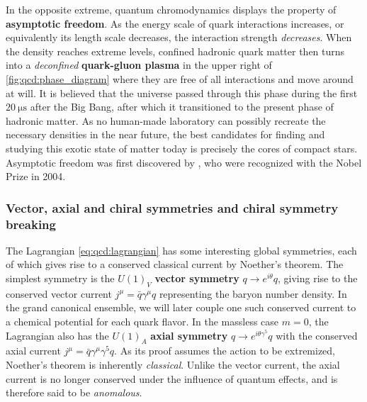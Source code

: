 In the opposite extreme, quantum chromodynamics displays the property of \textbf{asymptotic freedom}.
As the energy scale of quark interactions increases, or equivalently its length scale decreases, the interaction strength \emph{decreases}.
When the density reaches extreme levels, confined hadronic quark matter then turns into a \emph{deconfined} \textbf{quark-gluon plasma} in the upper right of \cref{fig:qcd:phase_diagram} where they are free of all interactions and move around at will.
It is believed that the universe passed through this phase during the first $\SI{20}{\micro\second}$ after the Big Bang, after which it transitioned to the present phase of hadronic matter.
As no human-made laboratory can possibly recreate the necessary densities in the near future, the best candidates for finding and studying this exotic state of matter today is precisely the cores of compact stars.
Asymptotic freedom was first discovered by \cite{ref:asymptotic_freedom_gross_wilczek,ref:asymptotic_freedom_politzer}, who were recognized with the Nobel Prize in 2004.

\subsubsection{Vector, axial and chiral symmetries and chiral symmetry breaking}

The Lagrangian \eqref{eq:qcd:lagrangian} has some interesting global symmetries, each of which gives rise to a conserved classical current by Noether's theorem.
The simplest symmetry is the $U(1)_V$ \textbf{vector symmetry} $q \rightarrow e^{i \theta} q$, giving rise to the conserved vector current $j^\mu = \bar{q} \gamma^\mu q$ representing the baryon number density.
In the grand canonical ensemble, we will later couple one such conserved current to a chemical potential for each quark flavor.
In the massless case $m = 0$, the Lagrangian also has the $U(1)_A$ \textbf{axial symmetry} $q \rightarrow e^{i \theta \gamma^5} q$ with the conserved axial current $j^\mu = \bar{q} \gamma^\mu \gamma^5 q$.
As its proof assumes the action to be extremized, Noether's theorem is inherently \emph{classical}.
Unlike the vector current, the axial current is no longer conserved under the influence of quantum effects, and is therefore said to be \emph{anomalous}.

